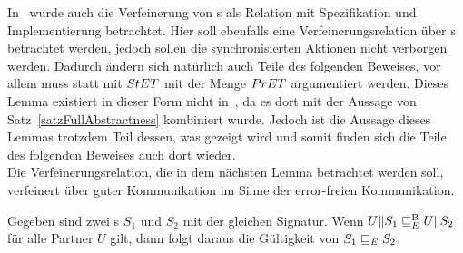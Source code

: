 In~\cite{Vogler2014EIO} wurde auch die Verfeinerung von \EIO{}s als Relation
mit Spezifikation und Implementierung betrachtet. Hier soll ebenfalls eine
Verfeinerungsrelation über \EIO{}s betrachtet werden, jedoch sollen die
synchronisierten Aktionen nicht verborgen werden. Dadurch ändern sich natürlich
auch Teile des folgenden Beweises, vor allem muss statt mit $StET{}$ mit der Menge
$PrET{}$ argumentiert werden. Dieses Lemma existiert in dieser Form nicht
in~\cite{Schlosser2012BA}, da es dort mit der Aussage von
Satz~\ref{satzFullAbstractness} kombiniert wurde. Jedoch ist die Aussage dieses
Lemmas trotzdem Teil dessen, was gezeigt wird und somit finden sich die Teile
des folgenden Beweises auch dort wieder.\\
Die Verfeinerungsrelation, die in dem nächsten Lemma betrachtet werden soll,
verfeinert über guter Kommunikation im Sinne der error-freien Kommunikation.

\begin{lem}
\label{lemVerfeinerung}
  Gegeben sind zwei \EIO{}s $S_1$ und $S_2$ mit der gleichen Signatur. Wenn
  $U\|S_1 \sqsubseteq _E^\mathrm{B} U\|S_2$ für alle Partner $U$ gilt, dann folgt daraus die
  Gültigkeit von $S_1\sqsubseteq _E S_2$.
\end{lem}

